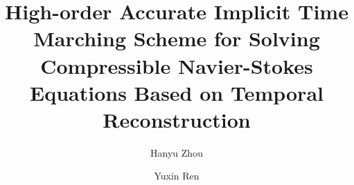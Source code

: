 \documentclass[preprint,12pt]{elsarticle}
\begin{document}
\begin{frontmatter}


    \title{High-order Accurate Implicit Time Marching Scheme for
        Solving Compressible Navier-Stokes Equations Based on Temporal
        Reconstruction}




    \author[THUDEM]{Hanyu Zhou}
    \author[THUDEM]{Yuxin Ren}





\end{frontmatter}
\end{document}
